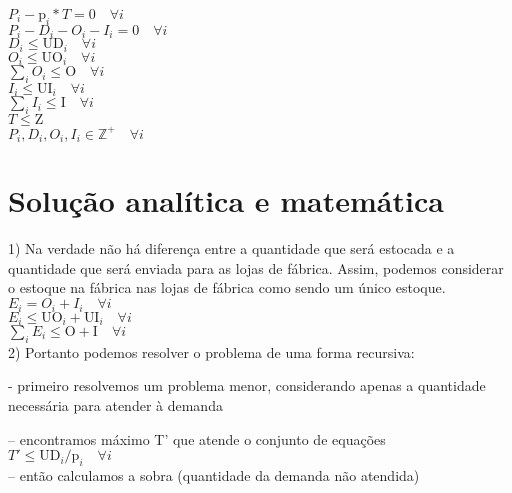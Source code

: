 \documentclass{book}
\begin{document}
$P_i - \textrm{p}_i * T  = 0 \quad \forall i$ \\

$P_i - D_i - O_i - I_i = 0 \quad \forall i$ \\

$D_i \leq \textrm{UD}_i \quad \forall i$ \\

$O_i \leq \textrm{UO}_i \quad \forall i$ \\

$\sum_i{O_i} \leq \textrm{O} \quad \forall i$ \\

$I_i \leq \textrm{UI}_i \quad \forall i$ \\

$\sum_i{I_i} \leq \textrm{I} \quad \forall i$ \\

$T \leq \textrm{Z}$ \\

$P_i, D_i, O_i, I_i \in  \mathbb{Z}^+ \quad \forall i$


\section{Solução analítica e matemática}

1) Na verdade não há diferença entre a quantidade que será estocada e a quantidade que será enviada para as lojas de fábrica. Assim, podemos considerar o estoque na fábrica nas lojas de fábrica como sendo um único estoque. \\

$E_i = O_i + I_i \quad \forall i $ \\

$E_i \leq \textrm{UO}_i + \textrm{UI}_i \quad \forall i$ \\

$\sum_i{E_i} \leq \textrm{O} + \textrm{I} \quad \forall i$ \\

2) Portanto podemos resolver o problema de uma forma recursiva:

 - primeiro resolvemos um problema menor, considerando apenas a quantidade necessária para atender à demanda
 
 		-- encontramos máximo T' que atende o conjunto de equações \\
 		
 		$ T' \leq \textrm{UD}_i/\textrm{p}_i \quad \forall i$ \\
 		
 		-- então calculamos a sobra (quantidade da demanda não atendida) \\
 		
\end{document}

